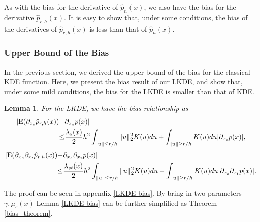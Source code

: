 \documentclass[aos,preprint]{imsart}
\newtheorem{lemma}[theorem]{Lemma}
\theoremstyle{remark}
\begin{document}
As with the bias for the derivative of $\hat{p}_n(x)$, we also have the bias for the derivative $\hat{p}_{r,h}(x)$. It is easy to show that, under some conditions, the bias of the derivatives of $\hat{p}_{r,h}(x)$ is less than that of $\hat{p}_n(x)$.
\subsubsection{Upper Bound of the Bias}
In the previous section, we derived the upper bound of the bias for the classical KDE function. Here, we present the bias result of our LKDE, and show that, under some mild conditions, the bias for the LKDE is smaller than that of KDE.

\begin{lemma} For the LKDE, we have the bias relationship as
\begin{equation*}\label{order11}
\begin{aligned} 
|{\rm E}( \partial_{x_s}  \hat{p}_{r,h}(x)) - & \partial_{x_s } p(x)| \\
\leq & \frac{\lambda_s(x)}{2} h^2 \int_{\|u\|\leq r /h} \|u\|_2^2 K(u) du +  \int_{\|u\|\geq r/h} K(u) du |\partial_{x_s} p(x)|,\\
\end{aligned}
\end{equation*}
\begin{equation*}\label{order22}
\begin{aligned}
 |{\rm E} (\partial_{x_s} \partial_{x_t}   \hat{p}_{r, h}(x)) -  &\partial_{x_s} \partial_{x_t} p(x)| \\
\leq &\frac{\lambda_{st}(x)}{2} h^2 \int_{\|u\|\leq r /h} \|u\|_2^2 K(u) du +  \int_{\|u\|\geq r/h} K(u) du  |\partial_{x_s} \partial_{x_t} p(x)| .
\end{aligned}
\end{equation*}
\end{lemma}
The proof can be seen in appendix \ref{LKDE bias}. By bring in two parameters $\gamma,\mu_s(x)$ Lemma \ref{LKDE bias} can be further simplified as Theorem \ref{bias_theorem}.
\end{document}
